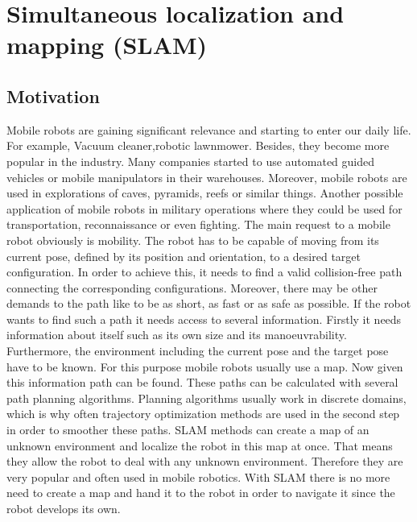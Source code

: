 \chapter{Simultaneous localization and mapping (SLAM)}

\section{Motivation}
Mobile robots are gaining significant relevance and starting to enter our daily life. For example, Vacuum cleaner,robotic lawnmower. Besides, they become more popular in the industry. Many companies started to use automated guided vehicles or mobile manipulators in their warehouses. Moreover, mobile robots are used in explorations of caves, pyramids, reefs or similar things. Another possible application of mobile robots in military operations where they could be used for transportation, reconnaissance or even fighting. The main request to a mobile robot obviously is mobility. The robot has to be capable of moving from its current pose, defined by its position and orientation, to a desired target configuration. In order to achieve this, it needs to find a valid collision-free path connecting the corresponding configurations. Moreover, there may be other demands to the path like to be as short, as fast or as safe as possible. If the robot wants to find such a path it needs access to several information. Firstly it needs information about itself such as its own size and its manoeuvrability. Furthermore, the environment including the current pose and the target pose have to be known. For this purpose mobile robots usually use a map. Now given this information path can be found. These paths can be calculated with several path planning algorithms. Planning algorithms usually work in discrete domains, which is why often trajectory optimization methods are used in the second step in order to smoother these paths. SLAM methods can create a map of an unknown environment and localize the robot in this map at once. That means they allow the robot to deal with any unknown environment. Therefore they are very popular and often used in mobile robotics. With SLAM there is no more need to create a map and hand it to the robot in order to navigate it since the robot develops its own.\cite{ustintern}




